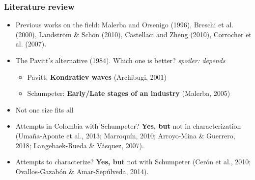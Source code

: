 \documentclass{beamer}
\begin{document}
\begin{frame}[allowframebreaks]
	\frametitle{Literature review}
	\begin{itemize}
		\item Previous works on the field: Malerba and Orsenigo (1996), Breschi et al. (2000), Landström \& Schön (2010), Castellaci and Zheng (2010), Corrocher et al. (2007).
		\item The Pavitt's alternative (1984). Which one is better? \textit{spoiler: depends}
		\begin{itemize}
			\item Pavitt: \textbf{Kondratiev waves} (Archibugi, 2001)
			\item Schumpeter: \textbf{Early/Late stages of an industry} (Malerba, 2005)
		\end{itemize}
	\end{itemize}
	\framebreak
	\begin{itemize}
		\item Not one size fits all
		\item Attempts in Colombia with Schumpeter? \textbf{Yes, but} not in characterization (Umaña-Aponte et al., 2013; Marroquín, 2010; Arroyo-Mina \& Guerrero, 2018; Langebaek-Rueda \& Vásquez, 2007).
		\item Attempts to characterize? \textbf{Yes, but} not with Schumpeter (Cerón et al., 2010; Ovallos-Gazabón \& Amar-Sepúlveda, 2014).
	\end{itemize}
\end{frame}
\end{document}
